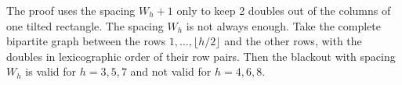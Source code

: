 \begin{remark}\label{rem:spacing}
The proof uses the spacing $W_h+1$ only to keep 2 doubles out of the columns of one tilted
rectangle. The spacing $W_h$ is not always enough. Take the complete bipartite graph
between the rows $1,\dots,\lfloor h/2\rfloor$ and the other rows, with the doubles in
lexicographic order of their row pairs. Then the blackout with spacing $W_h$ is valid for
$h=3,5,7$ and not valid for $h=4,6,8$.
\end{remark}
